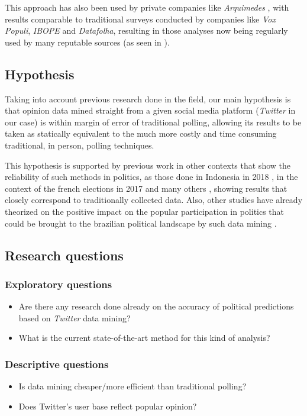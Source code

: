 \documentclass[conference]{IEEEtran}
\begin{document}
This approach has also been used by private companies like \emph{Arquimedes} \cite{Arquimedes2021}, with results comparable to traditional surveys conducted by companies like \emph{Vox Populi}, \emph{IBOPE} and \emph{Datafolha}, resulting in those analyses now being regularly used by many reputable sources (as seen in \cite{arquimedesMidia}).

\subsection{Hypothesis}
\label{sec:org90c65ea}
Taking into account previous research done in the field, our main hypothesis is that opinion data mined straight from a given social media platform (\emph{Twitter} in our case) is within margin of error of traditional polling, allowing its results to be taken as statically equivalent to the much more costly and time consuming traditional, in person, polling techniques.

This hypothesis is supported by previous work in other contexts that show the reliability of such methods in politics, as those done in Indonesia in 2018 \cite{Budiharto2018}, in the context of the french elections in 2017 \cite{Wang2017} and many others \cite{Tumasjan2010}\cite{Kassraie2017}, showing results that closely correspond to traditionally collected data. Also, other studies have already theorized on the positive impact on the popular participation in politics that could be brought to the brazilian political landscape by such data mining \cite{Oliveira2019} \cite{Oliveira2017}.

\subsection{Research questions}
\label{sec:org6f7930e}
\subsubsection{Exploratory questions}
\label{sec:org92a8117}
\begin{itemize}
\item Are there any research done already on the accuracy of political predictions based on \emph{Twitter} data mining?
\item What is the current state-of-the-art method for this kind of analysis?
\end{itemize}
\subsubsection{Descriptive questions}
\label{sec:org9029496}
\begin{itemize}
\item Is data mining cheaper/more efficient than traditional polling?
\item Does Twitter's user base reflect popular opinion?
\end{itemize}
\end{document}
